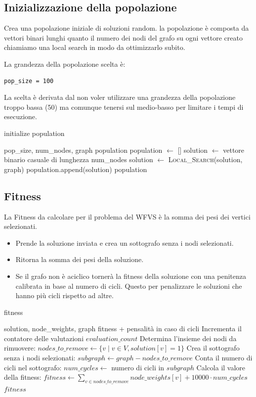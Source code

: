 \documentclass[a4paper,12pt]{article}
\begin{document}
\subsection{Inizializzazione della popolazione}
Crea una popolazione iniziale di soluzioni random.
la popolazione è composta da vettori binari lunghi quanto il numero dei nodi del grafo
su ogni vettore creato chiamiamo una local search in modo da ottimizzarlo subito. 

La grandezza della popolazione scelta è: 
\begin{verbatim}
pop_size = 100
\end{verbatim}
La scelta è derivata dal non voler utilizzare una grandezza della popolazione troppo bassa (50) ma comunque tenersi sul medio-basso per limitare i tempi di esecuzione.
\begin{algorithm}[H]
\caption{initialize population}
\begin{algorithmic}[1]
\Require pop\_size, num\_nodes, graph
\Ensure population
\State population $\leftarrow$ []
    \State solution $\leftarrow$ vettore binario casuale di lunghezza num\_nodes
    \State solution $\leftarrow$ \textsc{Local\_Search}(solution, graph)
    \State population.append(solution)
\EndFor
\State \Return population
\end{algorithmic}
\end{algorithm}

\subsection{Fitness}
La Fitness da calcolare per il problema del WFVS è la somma dei pesi dei vertici selezionati.
\begin{itemize}
    \item Prende la soluzione inviata e crea un sottografo senza i nodi selezionati.
    \item Ritorna la somma dei pesi della soluzione.
    \item Se il grafo non è aciclico tornerà la fitness della soluzione con una penitenza calibrata in base al numero di cicli.
    Questo per penalizzare le soluzioni che hanno più cicli rispetto ad altre.
\end{itemize}
\begin{algorithm}[H]
\caption{fitness}
\begin{algorithmic}[1]
\Require solution, node\_weights, graph
\Ensure fitness + pensalità in caso di cicli
\State Incrementa il contatore delle valutazioni $evaluation\_count$
\State Determina l'insieme dei nodi da rimuovere: 
\State \quad $nodes\_to\_remove \gets \{ v \mid v \in V, \mathit{solution}[v] = 1 \}$
\State Crea il sottografo senza i nodi selezionati: $subgraph \gets graph - nodes\_to\_remove$
\State Conta il numero di cicli nel sottografo: $num\_cycles \gets$ numero di cicli in $subgraph$
\State Calcola il valore della fitness: 
\State \quad $fitness \gets \sum_{v \in nodes\_to\_remove} node\_weights[v] + 10000 \cdot num\_cycles$
\Return $fitness$
\end{algorithmic}
\end{algorithm}
\end{document}
